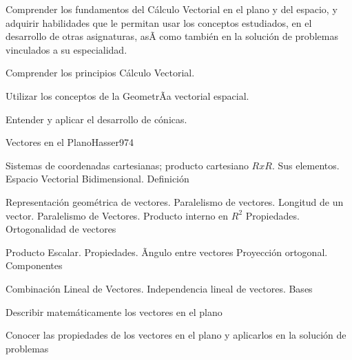 \begin{syllabus}


\begin{justification}
Comprender los fundamentos del Cálculo Vectorial en el plano y del espacio, y adquirir habilidades que le permitan usar los conceptos estudiados, en el desarrollo de otras asignaturas, asÃ­ como también en la solución de problemas vinculados a su especialidad.
\end{justification}

\begin{goals}
\item Comprender los principios Cálculo Vectorial.
\item Utilizar los conceptos de la GeometrÃ­a vectorial espacial.
\item Entender y aplicar el desarrollo de cónicas.
\end{goals}

\begin{outcomes}
\end{outcomes}

\begin{unit}{Vectores en el Plano}{Hasser97}{4}
   \begin{topics}
      \item Sistemas de coordenadas cartesianas; producto cartesiano $RxR$. Sus elementos. Espacio Vectorial Bidimensional. Definición
      \item Representación geométrica de vectores. Paralelismo de vectores. Longitud de un  vector. Paralelismo de Vectores. Producto interno en $R^2$ Propiedades. Ortogonalidad de vectores
      \item Producto Escalar. Propiedades. Ãngulo entre vectores Proyección ortogonal. Componentes
      \item Combinación Lineal de Vectores. Independencia lineal de vectores. Bases
   \end{topics}

   \begin{unitgoals}
      \item Describir matemáticamente los vectores en el plano
      \item Conocer las propiedades de los vectores en el plano y aplicarlos en la solución de problemas
   \end{unitgoals}
\end{unit}


\end{syllabus}
